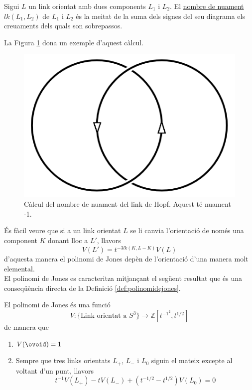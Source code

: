 \begin{definition}\label{def:nombredenllaç}
	Sigui $L$ un link orientat amb dues components $L_1$ i $L_2$. El \underline{nombre de nuament} $lk(L_1,L_2)$ de $L_1$ i $L_2$ és la meitat de la suma dels signes del seu diagrama els creuaments dels quals son sobrepassos.
\end{definition}

La Figura \ref{fig:nombredenuament} dona un exemple d'aquest càlcul.\\

\begin{figure}
	\centering
	\includegraphics[width=0.6\linewidth]{img/nombredenuament.png}
	\caption{Càlcul del nombre de nuament del link de Hopf. Aquest té nuament -1.}\label{fig:nombredenuament}
\end{figure}

És fàcil veure que si a un link orientat $L$ se li canvia l'orientació de només una component $K$ donant lloc a $L'$, llavors $$V(L')=t^{-3lk(K,L-K)}V(L)$$ d'aquesta manera el polinomi de Jones depèn de l'orientació d'una manera molt elemental.\\

El polinomi de Jones es caracteritza mitjançant el següent resultat que és una conseqüència directa de la Definició \ref{def:polinomidejones}.\\

\begin{proposition}\label{prop:jones}
	El polinomi de Jones és una funció $$V:\{\text{Link orientat a }S^3\}\rightarrow \mathbb{Z}[t^{-1^2},t^{1/2}]$$ de manera que
	\begin{enumerate}
		\item $V(\ovoid)=1$
		\item\label{item:skeinrelation} Sempre que tres links orientats $L_{+}$, $L_{-}$ i $L_{0}$ siguin el mateix excepte al voltant d'un punt, llavors $$t^{-1}V(L_{+})-tV(L_{-})+(t^{-1/2}-t^{1/2})V(L_{0})=0$$
	\end{enumerate}
\end{proposition}


